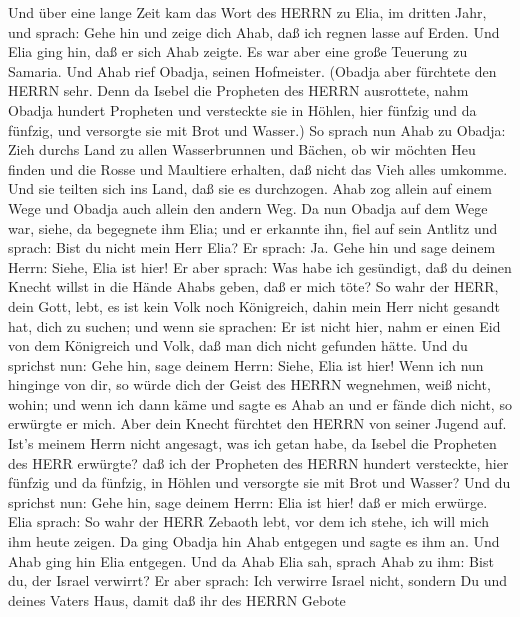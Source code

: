  Und über eine lange Zeit kam das Wort des HERRN zu Elia, im
dritten Jahr, und sprach: Gehe hin und zeige dich Ahab, daß ich regnen
lasse auf Erden.  Und Elia ging hin, daß er sich Ahab
zeigte. Es war aber eine große Teuerung zu Samaria.  Und
Ahab rief Obadja, seinen Hofmeister. (Obadja aber fürchtete den HERRN
sehr.  Denn da Isebel die Propheten des HERRN ausrottete,
nahm Obadja hundert Propheten und versteckte sie in Höhlen, hier fünfzig
und da fünfzig, und versorgte sie mit Brot und Wasser.)  So
sprach nun Ahab zu Obadja: Zieh durchs Land zu allen Wasserbrunnen und
Bächen, ob wir möchten Heu finden und die Rosse und Maultiere erhalten,
daß nicht das Vieh alles umkomme.  Und sie teilten sich ins
Land, daß sie es durchzogen. Ahab zog allein auf einem Wege und Obadja
auch allein den andern Weg.  Da nun Obadja auf dem Wege war,
siehe, da begegnete ihm Elia; und er erkannte ihn, fiel auf sein Antlitz
und sprach: Bist du nicht mein Herr Elia?  Er sprach: Ja.
Gehe hin und sage deinem Herrn: Siehe, Elia ist hier!  Er
aber sprach: Was habe ich gesündigt, daß du deinen Knecht willst in die
Hände Ahabs geben, daß er mich töte?  So wahr der HERR,
dein Gott, lebt, es ist kein Volk noch Königreich, dahin mein Herr nicht
gesandt hat, dich zu suchen; und wenn sie sprachen: Er ist nicht hier,
nahm er einen Eid von dem Königreich und Volk, daß man dich nicht
gefunden hätte.  Und du sprichst nun: Gehe hin, sage deinem
Herrn: Siehe, Elia ist hier!  Wenn ich nun hinginge von
dir, so würde dich der Geist des HERRN wegnehmen, weiß nicht, wohin; und
wenn ich dann käme und sagte es Ahab an und er fände dich nicht, so
erwürgte er mich. Aber dein Knecht fürchtet den HERRN von seiner Jugend
auf.  Ist's meinem Herrn nicht angesagt, was ich getan
habe, da Isebel die Propheten des HERR erwürgte? daß ich der Propheten
des HERRN hundert versteckte, hier fünfzig und da fünfzig, in Höhlen und
versorgte sie mit Brot und Wasser?  Und du sprichst nun:
Gehe hin, sage deinem Herrn: Elia ist hier! daß er mich erwürge.
 Elia sprach: So wahr der HERR Zebaoth lebt, vor dem ich
stehe, ich will mich ihm heute zeigen.  Da ging Obadja hin
Ahab entgegen und sagte es ihm an. Und Ahab ging hin Elia entgegen.
 Und da Ahab Elia sah, sprach Ahab zu ihm: Bist du, der
Israel verwirrt?  Er aber sprach: Ich verwirre Israel
nicht, sondern Du und deines Vaters Haus, damit daß ihr des HERRN Gebote

